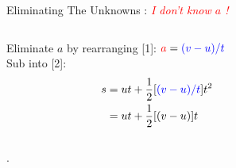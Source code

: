\begin{frame}{ Eliminating The Unknowns  : \textit{\textcolor{red}{I don't know $a$ !} }}
\small


\begin{columns}[T]
\begin{column}{0.7\textwidth}
 Eliminate $a$ by rearranging [1]: $\textcolor{red}{a}= \textcolor{blue}{ (v-u) / t}$\\[1ex]
Sub into [2]: 
\begin{equation}\nonumber
\begin{split}
s  &= ut + \frac{1}{2} [\textcolor{blue}{(v-u) / t}] t^2  \\
& = ut + \frac{1}{2} [(v-u)] t \\
\end{split}
\end{equation}
\end{column}\hfill

\begin{column}{0.3\textwidth}

        
 \\[1ex] 
 \\[3ex] 
\end{column}
\end{columns}
\vspace{0.5cm}

.  \\[1ex]

\end{frame}


